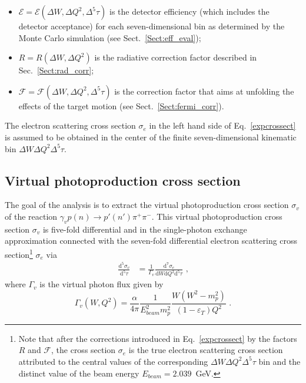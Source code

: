 \begin{itemize}
\item $\mathcal{E} = \mathcal{E}(\Delta W, \Delta Q^{2}, \Delta^{5}\tau)$ is the detector efficiency (which includes the detector acceptance) for each seven-dimensional bin as determined by the Monte Carlo simulation (see Sect.~\ref{Sect:eff_eval}); \vspace{-0.25em}

\item $R = R(\Delta W, \Delta Q^{2})$ is the radiative correction factor described in Sec.~\ref{Sect:rad_corr}; \vspace{-0.25em}

\item $\mathcal{F} = \mathcal{F}(\Delta W, \Delta Q^{2}, \Delta^{5}\tau)$ is the correction factor that aims at unfolding the effects of the target motion (see Sect.~\ref{Sect:fermi_corr}).

\end{itemize}

The electron scattering cross section $\sigma_{e}$ in the left hand side of Eq.~\eqref{expcrossect} is assumed to be obtained in the center of the finite seven-dimensional kinematic bin $\Delta W \Delta Q^{2} \Delta^{5} \tau$. 



\subsection{Virtual photoproduction cross section}

The goal of the analysis is to extract the virtual photoproduction cross section $\sigma_{v}$ of the reaction $\gamma_{v}p(n) \rightarrow p'(n') \pi^{+} \pi^{-}$. This virtual photoproduction cross section $\sigma_{v}$ is five-fold differential and in the single-photon exchange approximation connected with the seven-fold differential electron scattering cross section\footnote[12]{Note that after the corrections introduced in Eq.~\eqref{expcrossect} by the factors $R$ and $\mathcal{F}$, the cross section $\sigma_{e}$ is the true electron scattering cross section attributed to the central values of the corresponding $\Delta W \Delta Q^{2} \Delta^{5} \tau$ bin and the distinct value of the beam energy $E_{beam} = 2.039$~GeV.} $\sigma_{e}$ via 
\begin{equation}
\begin{aligned}
\frac{\textrm{d}^{5}\sigma_{v}}{\textrm{d}^{5}\tau} &= \frac{1}{\Gamma_{v}}\frac{\textrm{d}^{7}\sigma_{e}}{\textrm{d}W\textrm{d}Q^{2}\textrm{d}^{5}\tau}  \textrm{ ,}
\end{aligned} 
\label{fulldiff}
\end{equation}
where $\Gamma_{v}$ is the virtual photon flux given by
\begin{equation}
\Gamma_{v} (W, Q^2) =
\frac{\alpha}{4\pi}\frac{1}{E_{beam}^{2}m_{p}^{2}}\frac{W(W^{2}-m_{p}^{2})}
{(1-\varepsilon_{T})Q^{2}} \textrm{ .}
\label{flux}
\end{equation}

